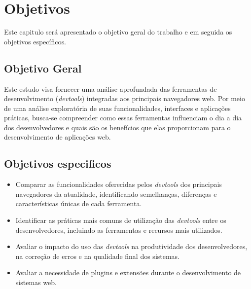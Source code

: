 \chapter{Objetivos}
\label{chap:objetivos}

Este capitulo será apresentado o objetivo geral do trabalho e em seguida os objetivos específicos.

\section{Objetivo Geral}
Este estudo visa fornecer uma análise aprofundada das ferramentas de desenvolvimento (\textit{devtools}) integradas aos principais navegadores web. Por meio de uma análise exploratória de suas funcionalidades, interfaces e aplicações práticas, busca-se compreender como essas ferramentas influenciam o dia a dia dos desenvolvedores e quais são os benefícios que elas proporcionam para o desenvolvimento de aplicações web. 

\section{Objetivos especificos}
\begin{itemize}
    \item Comparar as funcionalidades oferecidas pelos \textit{devtools} dos principais navegadores da atualidade, identificando semelhanças, diferenças e características únicas de cada ferramenta.
    \item Identificar as práticas mais comuns de utilização das \textit{devtools} entre os desenvolvedores, incluindo as ferramentas e recursos mais utilizados.
    \item Avaliar o impacto do uso das \textit{devtools} na produtividade dos desenvolvedores, na correção de erros e na qualidade final dos sistemas.
    \item Avaliar a necessidade de plugins e extensões durante o desenvolvimento de sistemas web.
\end{itemize}